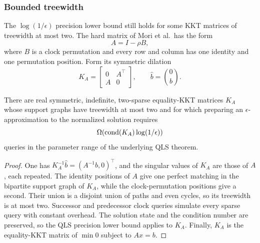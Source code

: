 \subsubsection{Bounded treewidth}

The $\log(1/\epsilon)$ precision lower bound still holds for some KKT
matrices of treewidth at most two.  The hard matrix of Mori et al.\ has the form
\begin{equation}
 A=I-\rho B,                                               \label{eq:structural-clock-matrix}
\end{equation}
where $B$ is a clock permutation and every row and column has one identity
and one permutation position.  Form its symmetric dilation
\begin{equation}
 K_A=\begin{bmatrix}0&A^\top\\A&0\end{bmatrix},\qquad
 \widehat b=\binom0b.                                    \label{eq:structural-treewidth-dilation}
\end{equation}

\begin{theorem}
\label{thm:structural-treewidth-two}
There are real symmetric, indefinite, two-sparse equality-KKT matrices $K_A$
whose support graphs have treewidth at most two and for which preparing an
$\epsilon$-approximation to the normalized solution requires
\begin{equation}
 \Omega\!\left(\operatorname{cond}(K_A)\log(1/\epsilon)\right)          \label{eq:structural-treewidth-qls}
\end{equation}
queries in the parameter range of the underlying QLS theorem.
\end{theorem}

\begin{proof}
One has
$K_A^{-1}\widehat b=(A^{-1}b,0)^\top$, and the singular values of $K_A$ are
those of $A$, each repeated.  The identity positions of $A$ give one perfect
matching in the bipartite support graph of $K_A$, while the clock-permutation
positions give a second.  Their union is a disjoint union of paths and even
cycles, so its treewidth is at most two.  Successor and predecessor clock
queries simulate every sparse query with constant overhead.  The solution state
and the condition number are preserved, so the QLS precision lower bound
applies to $K_A$.
Finally, $K_A$ is the equality-KKT matrix of $\min0$ subject to $Ax=b$.
\end{proof}

